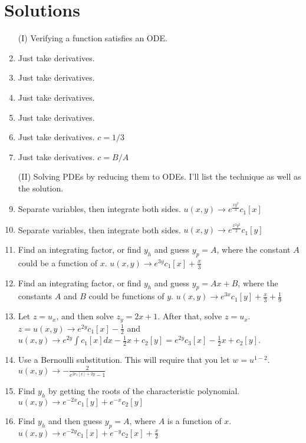 \section{Solutions}
{\small 

\begin{enumerate}
	\item[(I)] Verifying a function satisfies an ODE.  
	\item Just take derivatives. 
	\item Just take derivatives. 
	\item Just take derivatives. 
	\item Just take derivatives. 
	\item Just take derivatives. $c=1/3$
	\item Just take derivatives. $c=B/A$

  \item[(II)] Solving PDEs by reducing them to ODEs. I'll list the technique as well as the solution.
  \item 
  Separate variables, then integrate both sides.  
  $u(x,y)\to e^{\frac{x y^3}{3}} c_1[x]$
  \item 
  Separate variables, then integrate both sides.  
  $u(x,y)\to e^{\frac{x^2 y^2}{2}} c_1[y]$
  \item 
  Find an integrating factor, or find $y_h$ and guess $y_p=A$, where the constant $A$ could be a function of $x$.
  $u(x,y)\to e^{3 y} c_1[x]+\frac{x}{3}$
  
  \item 
  Find an integrating factor, or find $y_h$ and guess $y_p=Ax+B$, where the constants $A$ and $B$ could be functions of $y$.
  $u(x,y)\to e^{3 x} c_1[y]+\frac{x}{3}+\frac{1}{9}$
  \item 
  Let $z=u_x$, and then solve $z_y=2x+1$. After that, solve $z=u_x$.  
  $z=u(x,y)\to e^{2 y} c_1[x]-\frac{1}{2}$ and 
  $u(x,y)\to  e^{2 y}\int c_1[x]dx-\frac12 x +c_2[y] = e^{2 y} c_3[x]-\frac12 x +c_2[y]$.
	\item 
	Use a Bernoulli substitution.  This will require that you let $w=u^{1-2}$. 
	$u(x,y)\to -\frac{2}{e^{2 c_1[x]+2 y}-1}$
	\item 
	Find $y_h$ by getting the roots of the characteristic polynomial.
	$u(x,y)\to e^{-2 x} c_1[y]+e^{-x} c_2[y]$
	
	\item 
	Find $y_h$ and then guess $y_p=A$, where $A$ is a function of $x$.
	$u(x,y)\to e^{-2 y} c_1[x]+e^{-y} c_2[x]+\frac{x}{2}$
	

\end{enumerate}}
